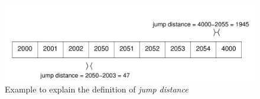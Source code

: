 \begin{figure}
	\centering
	\includegraphics[scale=0.6]{tracechar-figures/21-day/jumpdist-example.pdf}
	\caption{Example to explain the definition of \textit{jump distance}}
	\label{fig:jumpdist-example}
\end{figure}


